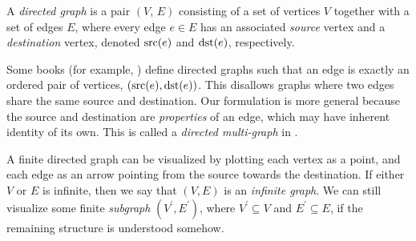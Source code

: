 \documentclass[../generics]{subfiles}
\begin{document}
\begin{definition}
A \emph{directed graph} is a pair $(V,\, E)$ consisting of a set of vertices $V$ together with a set of edges $E$, where every edge $e\in E$ has an associated \emph{source} vertex and a \emph{destination} vertex, denoted $\operatorname{src}(e)$ and $\operatorname{dst}(e)$, respectively.

Some books (for example, \cite{grimaldi}) define directed graphs such that an edge is exactly an ordered pair of vertices, $(\operatorname{src}(e),\operatorname{dst}(e))$. This disallows graphs where two edges share the same source and destination. Our formulation is more general because the source and destination are \emph{properties} of an edge, which may have inherent identity of its own. This is called a \emph{directed multi-graph} in \cite{alggraph}.

A finite directed graph can be visualized by plotting each vertex as a point, and each edge as an arrow pointing from the source towards the destination. If either $V$ or $E$ is infinite, then we say that $(V, E)$ is an \emph{infinite graph}. We can still visualize some finite \emph{subgraph} $(V^\prime, E^\prime)$, where $V^\prime\subseteq V$ and $E^\prime\subseteq E$, if the remaining structure is understood somehow.
\end{definition}
\end{document}
